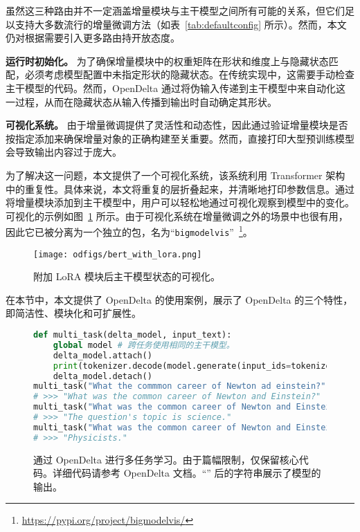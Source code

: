虽然这三种路由并不一定涵盖增量模块与主干模型之间所有可能的关系，但它们足以支持大多数流行的增量微调方法（如表~\ref{tab:defaultconfig} 所示）。然而，本文仍对根据需要引入更多路由持开放态度。

\textbf{运行时初始化。} 为了确保增量模块中的权重矩阵在形状和维度上与隐藏状态匹配，必须考虑模型配置中未指定形状的隐藏状态。在传统实现中，这需要手动检查主干模型的代码。然而，OpenDelta 通过将伪输入传递到主干模型中来自动化这一过程，从而在隐藏状态从输入传播到输出时自动确定其形状。


 \textbf{可视化系统。} 由于增量微调提供了灵活性和动态性，因此通过验证增量模块是否按指定添加来确保增量对象的正确构建至关重要。然而，直接打印大型预训练模型会导致输出内容过于庞大。

为了解决这一问题，本文提供了一个可视化系统，该系统利用 Transformer 架构中的重复性。具体来说，本文将重复的层折叠起来，并清晰地打印参数信息。通过将增量模块添加到主干模型中，用户可以轻松地通过可视化观察到模型中的变化。可视化的示例如图~\ref{fig:after_lora} 所示。由于可视化系统在增量微调之外的场景中也很有用，因此它已被分离为一个独立的包，名为“\texttt{bigmodelvis}”~\footnote{\url{https://pypi.org/project/bigmodelvis/}}。

\begin{figure}
    \centering
    \texttt{[image: odfigs/bert\_with\_lora.png]}
    \caption{附加 LoRA 模块后主干模型状态的可视化。}
    \label{fig:after_lora}
\end{figure}


在本节中，本文提供了 OpenDelta 的使用案例，展示了 OpenDelta 的三个特性，即简洁性、模块化和可扩展性。

\begin{figure}[hbt!]
\centering
\begin{minipage}{0.94\textwidth}
\begin{lstlisting}[language=Python]
def multi_task(delta_model, input_text):
    global model # 跨任务使用相同的主干模型。
    delta_model.attach()
    print(tokenizer.decode(model.generate(input_ids=tokenize(input_text))))
    delta_model.detach()
multi_task("What the commmon career of Newton ad einstein?", spelling_delta)
# >>> "What was the common career of Newton and Einstein?"
multi_task("What was the common career of Newton and Einstein?", topic_delta)
# >>> "The question's topic is science."
multi_task("What was the common career of Newton and Einstein?", question_delta)
# >>> "Physicists."
\end{lstlisting}
\end{minipage} 
\caption{通过 OpenDelta 进行多任务学习。由于篇幅限制，仅保留核心代码。详细代码请参考 OpenDelta 文档。``\>\>\>'' 后的字符串展示了模型的输出。}
\label{fig:code_multi_task} 
\end{figure}

